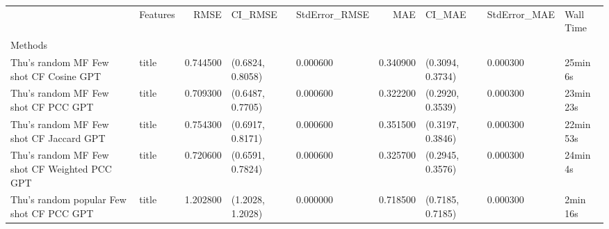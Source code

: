 \begin{tabular}{llrllrlll}
 & Features & RMSE & CI_RMSE & StdError_RMSE & MAE & CI_MAE & StdError_MAE & Wall Time \\
Methods &  &  &  &  &  &  &  &  \\
Thu's random MF Few shot CF Cosine GPT & title & 0.744500 & (0.6824, 0.8058) & 0.000600 & 0.340900 & (0.3094, 0.3734) & 0.000300 & 25min 6s \\
Thu's random MF Few shot CF PCC GPT & title & 0.709300 & (0.6487, 0.7705) & 0.000600 & 0.322200 & (0.2920, 0.3539) & 0.000300 & 23min 23s \\
Thu's random MF Few shot CF Jaccard GPT & title & 0.754300 & (0.6917, 0.8171) & 0.000600 & 0.351500 & (0.3197, 0.3846) & 0.000300 & 22min 53s \\
Thu's random MF Few shot CF Weighted PCC GPT & title & 0.720600 & (0.6591, 0.7824) & 0.000600 & 0.325700 & (0.2945, 0.3576) & 0.000300 & 24min 4s \\
Thu's random popular Few shot CF PCC GPT & title & 1.202800 & (1.2028, 1.2028) & 0.000000 & 0.718500 & (0.7185, 0.7185) & 0.000300 & 2min 16s \\
\end{tabular}
